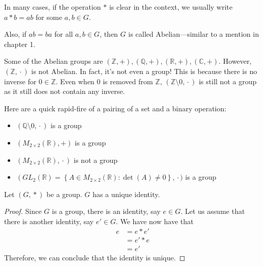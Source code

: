 \begin{remark}
    In many cases, if the operation \(*\) is clear in the context, we usually write \(a * b = ab\) for some \(a, b \in G\).

    Also, if \(ab = ba\) for all \(a, b \in G\), then \(G\) is called Abelian---similar to a mention in chapter 1.
\end{remark}

\begin{nexample}
    Some of the Abelian groups are \((\mathbb{Z}, +), (\mathbb{Q}, +), (\mathbb{R}, +), (\mathbb{C}, +)\). However, \((\mathbb{Z}, {}\cdot{})\) is not Abelian. In fact, it's not even a group! This is because there is no inverse for \(0 \in \mathbb{Z}\). Even when 0 is removed from \(\mathbb{Z}\), \((\mathbb{Z} \setminus 0, {}\cdot{})\) is still not a group as it still does not contain any inverse.
\end{nexample}

\begin{nexample}
    Here are a quick rapid-fire of a pairing of a set and a binary operation:
    \begin{itemize}
        \item \((\mathbb{Q} \setminus 0, {}\cdot{})\) is a group
        \item \(\left(M_{2 \times 2}(\mathbb{R}), +\right)\) is a group
        \item \(\left(M_{2 \times 2}(\mathbb{R}), {}\cdot{}\right)\) is not a group
        \item \(\left(GL_2(\mathbb{R}) = \left\{A \in M_{2 \times 2}(\mathbb{R}) : \det(A) \neq 0\right\}, {}\cdot{})\) is a group
    \end{itemize}
\end{nexample}

\begin{theorem}
    Let \((G, {}*{})\) be a group. \(G\) has a unique identity.
\end{theorem}

\begin{proof}
    Since \(G\) is a group, there is an identity, say \(e \in G\). Let us assume that there is another identity, say \(e' \in G\). We have now have that
    \[
    \begin{aligned}
        e &= e * e' \\
          &= e' * e \\
          &= e'
    \end{aligned}
    \]
    Therefore, we can conclude that the identity is unique.
\end{proof}
